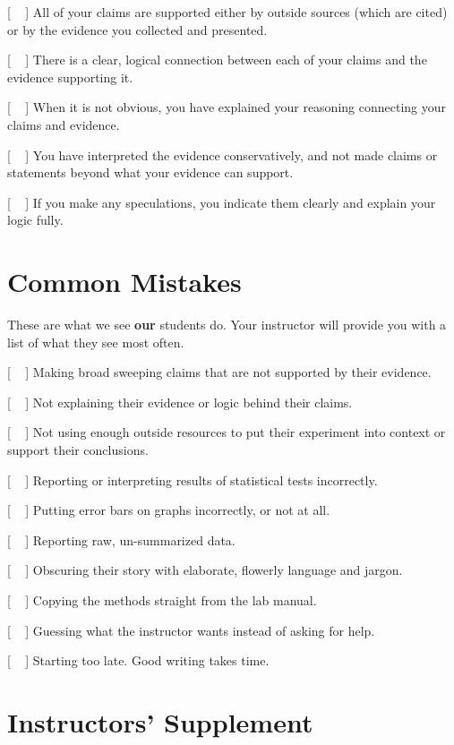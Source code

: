 \documentclass[
]{book}
\begin{document}
{[} ~ {]} All of your claims are supported either by outside sources (which are cited) or by the evidence you collected and presented.

{[} ~ {]} There is a clear, logical connection between each of your claims and the evidence supporting it.

{[} ~ {]} When it is not obvious, you have explained your reasoning connecting your claims and evidence.

{[} ~ {]} You have interpreted the evidence conservatively, and not made claims or statements beyond what your evidence can support.

{[} ~ {]} If you make any speculations, you indicate them clearly and explain your logic fully.

\hypertarget{common-mistakes}{%
\section*{Common Mistakes}\label{common-mistakes}}

These are what we see \textbf{our} students do. Your instructor will provide you with a list of what they see most often.

{[} ~ {]} Making broad sweeping claims that are not supported by their evidence.

{[} ~ {]} Not explaining their evidence or logic behind their claims.

{[} ~ {]} Not using enough outside resources to put their experiment into context or support their conclusions.

{[} ~ {]} Reporting or interpreting results of statistical tests incorrectly.

{[} ~ {]} Putting error bars on graphs incorrectly, or not at all.

{[} ~ {]} Reporting raw, un-summarized data.

{[} ~ {]} Obscuring their story with elaborate, flowerly language and jargon.

{[} ~ {]} Copying the methods straight from the lab manual.

{[} ~ {]} Guessing what the instructor wants instead of asking for help.

{[} ~ {]} Starting too late. Good writing takes time.

\hypertarget{instructors-supplement-6}{%
\section{Instructors' Supplement}\label{instructors-supplement-6}}
\end{document}

